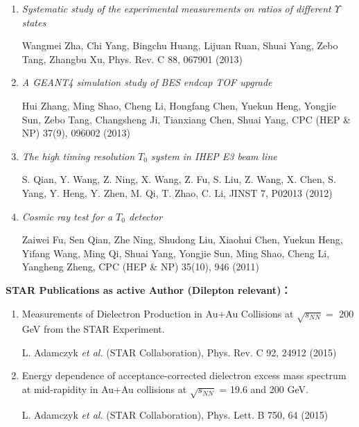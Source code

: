 \begin{enumerate}
\item {\it Systematic study of the experimental measurements on ratios of different $\varUpsilon$ states}

Wangmei Zha, Chi Yang, Bingchu Huang, Lijuan Ruan, Shuai Yang, Zebo Tang, Zhangbu Xu, Phys. Rev. C 88, 067901 (2013)

\item {\it A GEANT4 simulation study of BES\uppercase\expandafter{} endcap TOF upgrade}

Hui Zhang, Ming Shao, Cheng Li, Hongfang Chen, Yuekun Heng, Yongjie Sun, Zebo Tang, Changsheng Ji, Tianxiang Chen, Shuai Yang, CPC (HEP \& NP) 37(9), 096002 (2013)

\item {\it The high timing resolution $T_{0}$ system in IHEP E3 beam line}

S. Qian, Y. Wang, Z. Ning, X. Wang, Z. Fu, S. Liu, Z. Wang, X. Chen, S. Yang, Y. Heng, Y. Zhen, M. Qi, T. Zhao, C. Li, JINST 7, P02013 (2012)

\item {\it Cosmic ray test for a $T_{0}$ detector}

Zaiwei Fu, Sen Qian, Zhe Ning, Shudong Liu, Xiaohui Chen, Yuekun Heng, Yifang Wang, Ming Qi, Shuai Yang, Yongjie Sun, Ming Shao, Cheng Li, Yangheng Zheng, CPC (HEP \& NP) 35(10), 946 (2011)

\end{enumerate}

\noindent\textbf{STAR Publications as active Author (Dilepton relevant)：}

\begin{enumerate}

\item Measurements of Dielectron Production in Au+Au Collisions at $\sqrt{s_{NN}} =$ 200 GeV from the STAR Experiment.

L. Adamczyk {\it et al.} (STAR Collaboration), Phys. Rev. C 92, 24912 (2015)

\item Energy dependence of acceptance-corrected dielectron excess mass spectrum at mid-rapidity in Au+Au collisions at $\sqrt{s_{NN}}$ = 19.6 and 200 GeV.

 L. Adamczyk {\it et al.} (STAR Collaboration), Phys. Lett. B 750, 64 (2015)

\end{enumerate}